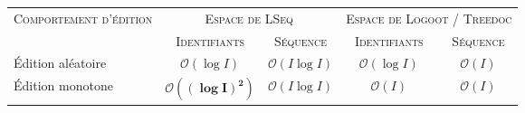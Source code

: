 
\small
\begin{tabularx}{1.2\textwidth}{@{}Xcccc@{}}

  \toprule
  \textsc{Comportement d'édition} & \multicolumn{2}{c}{\textsc{Espace de LSeq}} & \multicolumn{2}{c}{\textsc{Espace de Logoot} / \textsc{Treedoc}} \\ \cmidrule{2-3} \cmidrule{4-5} 
                   & \textsc{Identifiants} & \textsc{Séquence} & \textsc{Identifiants} & \textsc{Séquence} \\ \midrule
  Édition aléatoire & $\mathcal{O}(\log I)$ & $\mathcal{O}(I\log I)$ & $\mathcal{O}(\log I)$ & $\mathcal{O}(I)$\\
  Édition monotone & $\pmb{\mathcal{O}((\log I)^2)}$ & $\mathcal{O}(I \log I)$ & $\mathcal{O}(I)$ & $\mathcal{O}(I)$ \\ \bottomrule
\end{tabularx}

